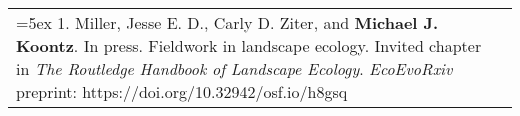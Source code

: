 \begin{longtable}{@{} >{\raggedright}p{6.25in} >{\raggedleft}X @{}}

\hangindent=5ex 1. Miller, Jesse E. D., Carly D. Ziter, and \textbf{Michael J. Koontz}. In press. Fieldwork in landscape ecology. Invited chapter in \emph{The Routledge Handbook of Landscape Ecology}. \newline \emph{EcoEvoRxiv} preprint: https://doi.org/10.32942/osf.io/h8gsq & \tabularnewline

\end{longtable}
